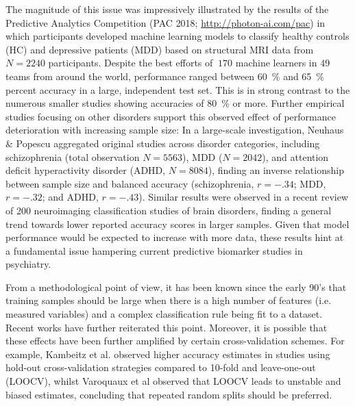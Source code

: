 \documentclass{article}
\begin{document}
    The magnitude of this issue was impressively illustrated by the results of the Predictive Analytics Competition (PAC 2018; \url{http://photon-ai.com/pac}) in which participants developed machine learning models to classify healthy controls (HC) and depressive patients (MDD) based on structural MRI data from $N=\num{2240}$ participants. Despite the best efforts of $~\num{170}$ machine learners in \num{49} teams from around the world, performance ranged between \SI{60}{\percent} and \SI{65}{\percent} percent accuracy in a large, independent test set. This is in strong contrast to the numerous smaller studies showing accuracies of \SI{80}{\percent} or more\cite{Johnston2015,Mwangi2012,Patel2015}.
    Further empirical studies focusing on other disorders support this observed effect of performance deterioration with increasing sample size: In a large-scale investigation, Neuhaus \& Popescu\cite{Neuhaus2018} aggregated original studies across disorder categories, including schizophrenia (total observation $N=\num{5563}$), MDD ($N=\num{2042}$), and attention deficit hyperactivity disorder (ADHD, $N=\num{8084}$), finding an inverse relationship between sample size and balanced accuracy (schizophrenia, $r=\num{-.34}$; MDD, $r=\num{-.32}$; and ADHD, $r=\num{-.43}$). Similar results were observed in a recent review of \num{200} neuroimaging classification studies of brain disorders, finding a general trend towards lower reported accuracy scores in larger samples\cite{Arbabshirani2017}. Given that model performance would be expected to increase with more data, these results hint at a fundamental issue hampering current predictive biomarker studies in psychiatry.

    From a methodological point of view, it has been known since the early 90’s that training samples should be large when there is a high number of features (i.e. measured variables) and a complex classification rule being fit to a dataset\cite{Raudys1991}. Recent works have further reiterated this point\cite{VanderPloeg2014}. Moreover, it is possible that these effects have been further amplified by certain cross-validation schemes. For example, Kambeitz et al.\cite{Kambeitz2017} observed higher accuracy estimates in studies using hold-out cross-validation strategies compared to 10-fold and leave-one-out (LOOCV), whilst Varoquaux et al observed that LOOCV leads to unstable and biased estimates, concluding that repeated random splits should be preferred\cite{Varoquaux2017}.
\end{document}
